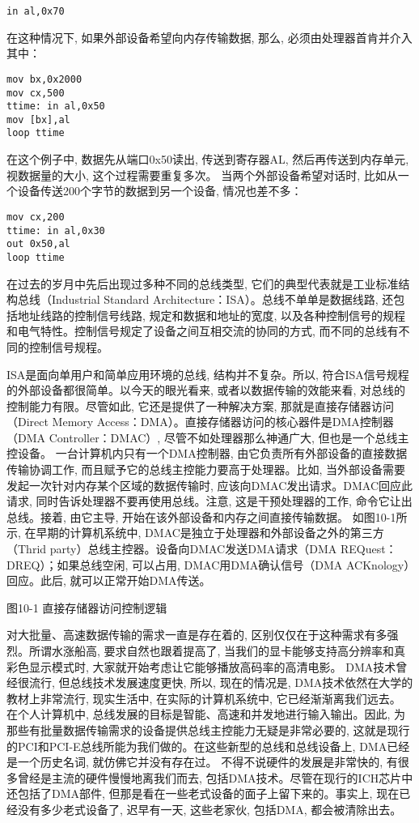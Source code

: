 \documentclass[12pt]{article}
\begin{document}
\begin{CJK}{UTF8}{gbsn}
\begin{verbatim}
in al,0x70
\end{verbatim}

在这种情况下, 如果外部设备希望向内存传输数据, 那么, 必须由处理器首肯并介入其中：
\begin{verbatim}
mov bx,0x2000
mov cx,500
ttime: in al,0x50
mov [bx],al
loop ttime
\end{verbatim}
在这个例子中, 数据先从端口0x50读出, 传送到寄存器AL, 然后再传送到内存单元, 视数据量的大小, 这个过程需要重复多次。
当两个外部设备希望对话时, 比如从一个设备传送200个字节的数据到另一个设备, 情况也差不多：

\begin{verbatim}
mov cx,200
ttime: in al,0x30
out 0x50,al
loop ttime
\end{verbatim}

在过去的岁月中先后出现过多种不同的总线类型, 它们的典型代表就是工业标准结构总线（Industrial Standard Architecture：ISA）。总线不单单是数据线路, 还包括地址线路的控制信号线路, 规定和数据和地址的宽度, 以及各种控制信号的规程和电气特性。控制信号规定了设备之间互相交流的协同的方式, 而不同的总线有不同的控制信号规程。

ISA是面向单用户和简单应用环境的总线, 结构并不复杂。所以, 符合ISA信号规程的外部设备都很简单。以今天的眼光看来, 或者以数据传输的效能来看, 对总线的控制能力有限。尽管如此, 它还是提供了一种解决方案, 那就是直接存储器访问（Direct Memory Access：DMA）。直接存储器访问的核心器件是DMA控制器（DMA Controller：DMAC）, 尽管不如处理器那么神通广大, 但也是一个总线主控设备。
一台计算机内只有一个DMA控制器, 由它负责所有外部设备的直接数据传输协调工作, 而且赋予它的总线主控能力要高于处理器。比如, 当外部设备需要发起一次针对内存某个区域的数据传输时, 应该向DMAC发出请求。DMAC回应此请求, 同时告诉处理器不要再使用总线。注意, 这是干预处理器的工作, 命令它让出总线。接着, 由它主导, 开始在该外部设备和内存之间直接传输数据。
如图10-1所示, 在早期的计算机系统中, DMAC是独立于处理器和外部设备之外的第三方（Thrid party）总线主控器。设备向DMAC发送DMA请求（DMA REQuest：DREQ）；如果总线空闲, 可以占用, DMAC用DMA确认信号（DMA ACKnology）回应。此后, 就可以正常开始DMA传送。
 
图10-1  直接存储器访问控制逻辑

对大批量、高速数据传输的需求一直是存在着的, 区别仅仅在于这种需求有多强烈。所谓水涨船高, 要求自然也跟着提高了, 当我们的显卡能够支持高分辨率和真彩色显示模式时, 大家就开始考虑让它能够播放高码率的高清电影。
DMA技术曾经很流行, 但总线技术发展速度更快, 所以, 现在的情况是, DMA技术依然在大学的教材上非常流行, 现实生活中, 在实际的计算机系统中, 它已经渐渐离我们远去。
在个人计算机中, 总线发展的目标是智能、高速和并发地进行输入输出。因此, 为那些有批量数据传输需求的设备提供总线主控能力无疑是非常必要的, 这就是现行的PCI和PCI-E总线所能为我们做的。在这些新型的总线和总线设备上, DMA已经是一个历史名词, 就仿佛它并没有存在过。
不得不说硬件的发展是非常快的, 有很多曾经是主流的硬件慢慢地离我们而去, 包括DMA技术。尽管在现行的ICH芯片中还包括了DMA部件, 但那是看在一些老式设备的面子上留下来的。事实上, 现在已经没有多少老式设备了, 迟早有一天, 这些老家伙, 包括DMA, 都会被清除出去。

\end{CJK}
\end{document}
